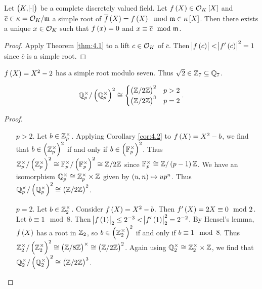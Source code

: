 \begin{corollary}
\label{cor:4.2}
Let $ \br{K, \abs{\cdot}} $ be a complete discretely valued field. Let $ f\br{X} \in \OOO_K\sbr{X} $ and $ \overline{c} \in \kappa = \mathcal{O}_K / \mathfrak{m} $ a simple root of $ \overline{f}\br{X} = f\br{X} \mod \mmm \in \kappa\sbr{X} $. Then there exists a unique $ x \in \mathcal{O}_K $ such that $ f\br{x} = 0 $ and $ x \equiv \overline{c} \mod {\mathfrak{m}} $.
\end{corollary}

\begin{proof}
Apply Theorem \ref{thm:4.1} to a lift $ c \in \mathcal{O}_K $ of $ \overline{c} $. Then $ \abs{f\br{c}} < \abs{f'\br{c}}^2 = 1 $ since $ \overline{c} $ is a simple root.
\end{proof}

\begin{example*}
$ f\br{X} = X^2 - 2 $ has a simple root modulo seven. Thus $ \sqrt{2} \in \mathbb{Z}_7 \subseteq \mathbb{Q}_7 $.
\end{example*}

\pagebreak

\begin{corollary}
$$ \QQ_p^\times / \br{\QQ_p^\times}^2 \cong
\begin{cases}
\br{\ZZ / 2\ZZ}^2 & p > 2 \\
\br{\ZZ / 2\ZZ}^3 & p = 2
\end{cases}.
$$
\end{corollary}

\begin{proof}
\hfill
\begin{itemize}[leftmargin=0.5in]
\item[$ p > 2 $.] Let $ b \in \mathbb{Z}_p^\times $. Applying Corollary \ref{cor:4.2} to $ f\br{X} = X^2 - b $, we find that $ b \in \br{\ZZ_p^\times}^2 $ if and only if $ b \in \br{\FF_p^\times}^2 $. Thus $ \ZZ_p^\times / \br{\ZZ_p^\times}^2 \cong \FF_p^\times / \br{\FF_p^\times}^2 \cong \ZZ / 2\ZZ $ since $ \FF_p^\times \cong \ZZ / \br{p - 1}\ZZ $. We have an isomorphism $ \mathbb{Q}_p^\times \cong \mathbb{Z}_p^\times \times \mathbb{Z} $ given by $ \br{u, n} \mapsto up^n $. Thus $ \QQ_p^\times / \br{\QQ_p^\times}^2 \cong \br{\ZZ / 2\ZZ}^2 $.
\item[$ p = 2 $.] Let $ b \in \mathbb{Z}_2^\times $. Consider $ f\br{X} = X^2 - b $. Then $ f'\br{X} = 2X \equiv 0 \mod 2 $. Let $ b \equiv 1 \mod 8 $. Then $ \abs{f\br{1}}_2 \le 2^{-3} < \abs{f'\br{1}}_2^2 = 2^{-2} $. By Hensel's lemma, $ f\br{X} $ has a root in $ \mathbb{Z}_2 $, so $ b \in \br{\ZZ_2^\times}^2 $ if and only if $ b \equiv 1 \mod 8 $. Thus $ \ZZ_2^\times / \br{\ZZ_2^\times}^2 \cong \br{\ZZ / 8\ZZ}^\times \cong \br{\ZZ / 2\ZZ}^2 $. Again using $ \mathbb{Q}_2^\times \cong \mathbb{Z}_2^\times \times \mathbb{Z} $, we find that $ \QQ_2^\times / \br{\QQ_2^\times}^2 \cong \br{\ZZ / 2\ZZ}^3 $.
\end{itemize}
\end{proof}

